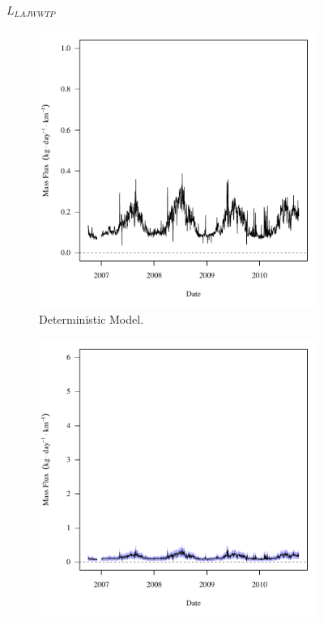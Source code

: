 \subfiguremid
\begin{landscape}
	\begin{figure}
		$ \displaystyle L_{LAJWWTP} $
		\begin{subfigure}{0.7\textwidth}
			\centering
			\includegraphics[width=\tableCustomSize]{"Figures/Results_USR/Deterministic/f WTP"}
			\caption{Deterministic Model.}
		\end{subfigure}%
		\begin{subfigure}{0.7\textwidth}
			\centering
			\includegraphics[width=\tableCustomSize]{"Figures/Results_USR/Stochastic/f WTP"}

\end{subfigure}
\end{figure}
\end{landscape}
